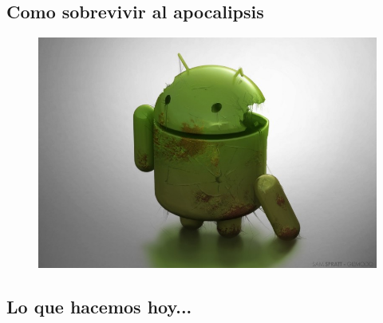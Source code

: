 \documentclass[12pt]{beamer} %
\begin{document}
\subsection{Como sobrevivir al apocalipsis}

\begin{slide}
    \begin{figure}[h]
      \includegraphics[height=0.9\textheight]{img/AndroidM.jpg}
    \end{figure}
\end{slide}


\subsection{Lo que hacemos hoy... }


\begin{slide}
  \begin{exampleblock}{}
    LOS ACTOS PRESENTES DERIVAN LA SITUACION FUTURA.
  \end{exampleblock}}
\end{slide}


\end{document}
